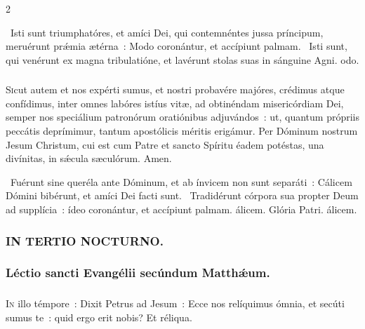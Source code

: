 \documentclass[9pt,twoside]{extarticle}
\begin{document}
\begin{multicols}{2}
{{{\begin{tightlist}{}
\item {}~Isti sunt triumphatóres, et amíci Dei, qui contemnéntes jussa príncipum, meruérunt prǽmia ætérna~: \textred{*} Modo coronántur, et accípiunt palmam. ~Isti sunt, qui venérunt ex magna tribulatióne, et lavérunt stolas suas in sánguine Agni. odo.
\end{tightlist}

\subsubsection*{\center {}}
\lettrine{S}icut autem et nos expérti sumus, et nostri probavére majóres, crédimus atque confídimus, inter omnes labóres istíus vitæ, ad obtinéndam misericórdiam Dei, semper nos speciálium patronórum oratiónibus adjuvándos~: ut, quantum própriis peccátis deprímimur, tantum apostólicis méritis erigámur. Per Dóminum nostrum Jesum Christum, cui est cum Patre et sancto Spíritu éadem potéstas, una divínitas, in sǽcula sæculórum. Amen.

\begin{tightlist}{}
\item {}~Fuérunt sine queréla ante Dóminum, et ab ínvicem non sunt separáti~: \textred{*} Cálicem Dómini bibérunt, et amíci Dei facti sunt.
~Tradidérunt córpora sua propter Deum ad supplícia~: ídeo coronántur, et accípiunt palmam. álicem. Glória Patri. álicem.
\end{tightlist}

\subsubsection*{\center \textsc{IN TERTIO NOCTURNO.}}
\subsubsection*{\center Léctio sancti Evangélii secúndum Matthǽum.}
\subsubsection*{\center {}}
\lettrine{I}n illo témpore~: Dixit Petrus ad Jesum~: Ecce nos relíquimus ómnia, et secúti sumus te~: quid ergo erit nobis? Et réliqua.

}}}
\end{multicols}
\end{document}
